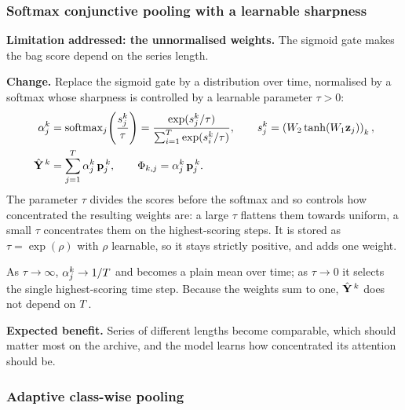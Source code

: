 \subsubsection{Softmax conjunctive pooling with a learnable sharpness}
\label{sec:pool:softmax}

\textbf{Limitation addressed: the unnormalised weights.} The sigmoid gate makes the bag score depend
on the series length.

\textbf{Change.} Replace the sigmoid gate by a distribution over time, normalised by a softmax whose
sharpness is controlled by a learnable parameter $\tau > 0$:
\begin{align}
  \alpha_j^k &= \operatorname{softmax}_j\!\left(\frac{s_j^k}{\tau}\right)
              = \frac{\exp(s_j^k/\tau)}{\sum_{i=1}^{T}\exp(s_i^k/\tau)},
  \qquad s_j^k = \left(W_2 \tanh(W_1 \mathbf{z}_j)\right)_k,
  \label{eq:sm_alpha}\\
  \hat{\mathbf{Y}}^{\,k} &= \sum_{j=1}^{T} \alpha_j^k \, \mathbf{p}_j^{\,k},
  \qquad
  \Phi_{k,j} = \alpha_j^k \, \mathbf{p}_j^{\,k}.
  \label{eq:sm_bag}
\end{align}
The parameter $\tau$ divides the scores before the softmax and so controls how concentrated the
resulting weights are: a large $\tau$ flattens them towards uniform, a small $\tau$ concentrates
them on the highest-scoring steps. It is stored as $\tau = \exp(\rho)$ with $\rho$ learnable, so it
stays strictly positive, and adds one weight.

\begin{property}
\label{prop:sm}
As $\tau \to \infty$, $\alpha_j^k \to 1/T$ and  becomes a plain mean over
time; as $\tau \to 0$ it selects the single highest-scoring time step. Because the weights sum to
one, $\hat{\mathbf{Y}}^{\,k}$ does not depend on $T$.
\end{property}

\textbf{Expected benefit.} Series of different lengths become comparable, which should matter most
on the \ucr{} archive, and the model learns how concentrated its attention should be.

\subsubsection{Adaptive class-wise pooling}
\label{sec:pool:adaptive}

